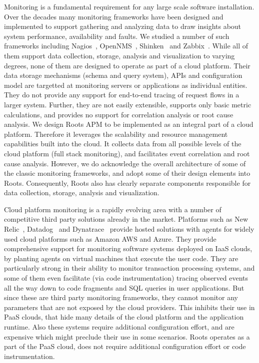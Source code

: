 Monitoring is a fundamental requirement for any large scale software installation.
Over the decades many monitoring frameworks have been designed and implemented to
support gathering and analyzing data to draw insights about system performance,
availability and faults. We studied a number of such frameworks including Nagios~\cite{nagios},
OpenNMS~\cite{opennms}, Shinken~\cite{shinken} and Zabbix~\cite{zabbix}. 
While all of them support data collection, storage,
analysis and visualization to varying degrees, none of them are designed
to operate as part of a cloud platform. Their data storage mechanisms (schema and query system),
APIs and configuration model are targetted at monitoring servers or 
applications as individual entities. They do not provide any support for
end-to-end tracing of request flows in a larger system. Further, they are not easily extensible,
supports only basic metric calculations, and provides no support for correlation
analysis or root cause analysis. We design Roots APM to be implemented as an integral
part of a cloud platform. Therefore it leverages the scalability and resource
management capabilities built into the cloud. It collects data from all
possible levels of the cloud platform (full stack monitoring), and facilitates
event correlation and root cause analysis. However, we do acknowledge the
overall architecture of some of the classic monitoring frameworks, and
adopt some of their design elements into Roots. Consequently, Roots also
has clearly separate components responsible for data collection, storage, analysis
and visualization.

Cloud platform monitoring is a rapidly evolving area with a number of 
competitive third party solutions already in the market. Platforms such
as New Relic~\cite{newrelic}, Datadog~\cite{datadog} and Dynatrace~\cite{dynatrace} 
provide hosted solutions with
agents for widely used cloud platforms such as Amazon AWS and Azure.
They provide comprehensive support for monitoring software
systems deployed on IaaS clouds, by planting agents on virtual
machines that execute the user code.
They are particularly strong in their ability to monitor transaction
processing systems, and some of them even facilitate (via code instrumentation) 
tracing observed events all the way down to code fragments and 
SQL queries in user applications.
But since these are third party monitoring frameworks, they cannot
monitor any parameters that are not exposed by the
cloud providers. This inhibits their use in PaaS clouds, that hide
many details of the cloud platform and the application runtime.  
Also these systems require additional configuration effort, and are expensive
which might preclude their use in some scenarios. Roots operates as a part
of the PaaS cloud, does not require additional configuration effort or code
instrumentation.

